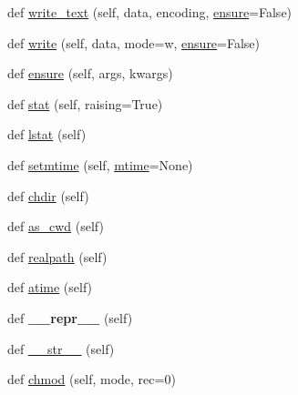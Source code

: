 \begin{DoxyCompactItemize}
\item 
def \hyperlink{classpy_1_1__path_1_1local_1_1_local_path_aeb4be3f7dfd24c476b2d47fe04f9aec3}{write\+\_\+text} (self, data, encoding, \hyperlink{classpy_1_1__path_1_1local_1_1_local_path_a31bafde86b043a1a5804f9ed21996251}{ensure}=False)
\item 
def \hyperlink{classpy_1_1__path_1_1local_1_1_local_path_a459df71cb1de18072af3f519bb5291f3}{write} (self, data, mode=\textquotesingle{}w\textquotesingle{}, \hyperlink{classpy_1_1__path_1_1local_1_1_local_path_a31bafde86b043a1a5804f9ed21996251}{ensure}=False)
\item 
def \hyperlink{classpy_1_1__path_1_1local_1_1_local_path_a31bafde86b043a1a5804f9ed21996251}{ensure} (self, args, kwargs)
\item 
def \hyperlink{classpy_1_1__path_1_1local_1_1_local_path_a98794b5e076a80672f971cfee84435b2}{stat} (self, raising=True)
\item 
def \hyperlink{classpy_1_1__path_1_1local_1_1_local_path_a2b9157d03687cea52d7598568909307a}{lstat} (self)
\item 
def \hyperlink{classpy_1_1__path_1_1local_1_1_local_path_adb999b83d7a153a04fe319f2aa15dea4}{setmtime} (self, \hyperlink{classpy_1_1__path_1_1local_1_1_local_path_a2cdcbc07a482fec0c653cd6c935c1ef4}{mtime}=None)
\item 
def \hyperlink{classpy_1_1__path_1_1local_1_1_local_path_a5aaaff4e57cec231ab12de73216b65f8}{chdir} (self)
\item 
def \hyperlink{classpy_1_1__path_1_1local_1_1_local_path_ad234257857ec631f4f4bf6a136a9ed05}{as\+\_\+cwd} (self)
\item 
def \hyperlink{classpy_1_1__path_1_1local_1_1_local_path_a2ddddaaee824f9ed74f9e670ab7b52cc}{realpath} (self)
\item 
def \hyperlink{classpy_1_1__path_1_1local_1_1_local_path_aae320d9796d03dacedac2fca54d77239}{atime} (self)
\item 
\mbox{\label{classpy_1_1__path_1_1local_1_1_local_path_a10425caaeeba4599b3a290858c4749fc}} 
def {\bfseries \+\_\+\+\_\+repr\+\_\+\+\_\+} (self)
\item 
def \hyperlink{classpy_1_1__path_1_1local_1_1_local_path_a3d604cf8849802d2219d796da99bb5b0}{\+\_\+\+\_\+str\+\_\+\+\_\+} (self)
\item 
def \hyperlink{classpy_1_1__path_1_1local_1_1_local_path_acd59507668f6890f6a6210cc8a159ddc}{chmod} (self, mode, rec=0)
\item 

\end{DoxyCompactItemize}

